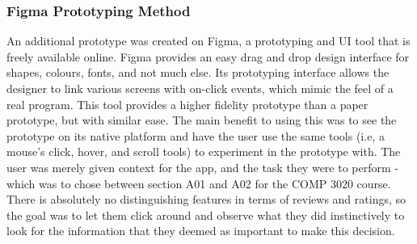 \documentclass{article}
\begin{document}
\subsubsection{Figma Prototyping Method}
An additional prototype was created on Figma, a prototyping and UI tool that is freely available online. Figma provides an easy drag and drop design interface for shapes, colours, fonts, and not much else. Its prototyping interface allows the designer to link various screens with on-click events, which mimic the feel of a real program. This tool provides a higher fidelity prototype than a paper prototype, but with similar ease. The main benefit to using this was to see the prototype on its native platform and have the user use the same tools (i.e, a mouse's click, hover, and scroll tools) to experiment in the prototype with. 
\newline
\newline
The user was merely given context for the app, and the task they were to perform - which was to chose between section A01 and A02 for the COMP 3020 course. There is absolutely no distinguishing features in terms of reviews and ratings, so the goal was to let them click around and observe what they did instinctively to look for the information that they deemed as important to make this decision. 
\end{document}
